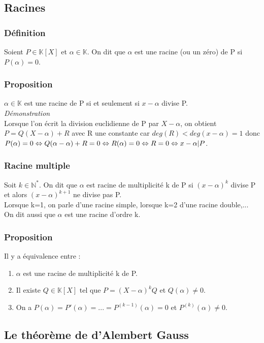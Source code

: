 \documentclass[a4paper,10pt]{book} %
\newcommand{\N}{\mathbb{N}}
\newcommand{\K}{\mathbb{K}}
\begin{document}
\subsection{Racines}
\subsubsection{Définition}
Soient $P\in \K[X]$ et $\alpha \in \K$. On dit que $\alpha$ est une racine (ou un zéro) de P si $P(\alpha)=0$.

\subsubsection{Proposition}
$\alpha\in\K$ est une racine de P si et seulement si $x-\alpha$ divise P.\\

\emph{Démonstration}\\
Lorsque l'on écrit la division euclidienne de P par $X-\alpha$, on obtient $P=Q(X-\alpha)+R$ avec R une constante car $deg(R) < deg(x-\alpha)=1$ donc $P(\alpha)=0 \Leftrightarrow Q(\alpha-\alpha)+R=0 \Leftrightarrow R(\alpha)=0\\
\Leftrightarrow R=0 \Leftrightarrow x-\alpha|P$.

\subsubsection{Racine multiple}
Soit $k\in \N^{*}$. On dit que $\alpha$ est racine de multiplicité k de P si $(x-\alpha)^{k}$ divise P et alors $(x-\alpha)^{k+1}$ ne divise pas P.\\
Lorsque k=1, on parle d'une racine simple, lorsque k=2 d'une racine double,... On dit aussi que $\alpha$ est une racine d'ordre k.

\subsubsection{Proposition}
Il y a équivalence entre :\begin{enumerate}
\item $\alpha$ est une racine de multiplicité k de P.
\item Il existe $Q\in \K[X]$ tel que $P=(X-\alpha)^{k}Q$ et $Q(\alpha) \neq 0$.
\item On a $P(\alpha)=P'(\alpha)=...=P^{(k-1)}(\alpha)=0$ et $P^{(k)}(\alpha)\neq 0$. \end{enumerate}

\subsection{Le théorème de d'Alembert Gauss}
\end{document}
